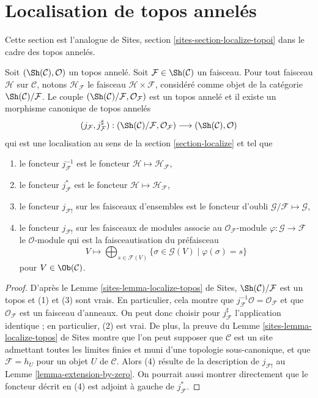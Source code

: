 \section{Localisation de topos annelés}
\label{section-localize-ringed-topoi}

\noindent
Cette section est l'analogue de
Sites, section \ref{sites-section-localize-topoi}
dans le cadre des topos annelés.

\begin{lemma}
\label{lemma-localize-ringed-topos}
Soit $(\Sh(\mathcal{C}), \mathcal{O})$ un topos annelé.
Soit $\mathcal{F} \in \Sh(\mathcal{C})$ un faisceau.
Pour tout faisceau $\mathcal{H}$ sur $\mathcal{C}$, notons
$\mathcal{H}_\mathcal{F}$ le faisceau $\mathcal{H} \times \mathcal{F}$,
considéré comme objet de la catégorie
$\Sh(\mathcal{C})/\mathcal{F}$. Le couple
$(\Sh(\mathcal{C})/\mathcal{F}, \mathcal{O}_\mathcal{F})$
est un topos annelé et il existe un morphisme canonique de topos annelés
$$
(j_\mathcal{F}, j_\mathcal{F}^\sharp) :
(\Sh(\mathcal{C})/\mathcal{F}, \mathcal{O}_\mathcal{F})
\longrightarrow
(\Sh(\mathcal{C}), \mathcal{O})
$$
qui est une localisation au sens de la
section \ref{section-localize} et tel que
\begin{enumerate}
\item le foncteur $j_\mathcal{F}^{-1}$ est le foncteur
$\mathcal{H} \mapsto \mathcal{H}_\mathcal{F}$,
\item le foncteur $j_\mathcal{F}^*$ est le foncteur
$\mathcal{H} \mapsto \mathcal{H}_\mathcal{F}$,
\item le foncteur $j_{\mathcal{F}!}$ sur les faisceaux d'ensembles est le
foncteur d'oubli $\mathcal{G}/\mathcal{F} \mapsto \mathcal{G}$,
\item le foncteur $j_{\mathcal{F}!}$ sur les faisceaux de modules associe au
$\mathcal{O}_\mathcal{F}$-module
$\varphi : \mathcal{G} \to \mathcal{F}$ le $\mathcal{O}$-module qui est la
faisceautisation du préfaisceau
$$
V \longmapsto
\bigoplus\nolimits_{s \in \mathcal{F}(V)}
\{\sigma \in \mathcal{G}(V) \mid \varphi(\sigma) = s \}
$$
pour $V \in \Ob(\mathcal{C})$.
\end{enumerate}
\end{lemma}

\begin{proof}
D'après le Lemme \ref{sites-lemma-localize-topos} de Sites,
$\Sh(\mathcal{C})/\mathcal{F}$ est un topos et (1) et (3) sont vrais.
En particulier, cela montre que
$j_\mathcal{F}^{-1}\mathcal{O} = \mathcal{O}_\mathcal{F}$ et que
$\mathcal{O}_\mathcal{F}$ est un faisceau d'anneaux.
On peut donc choisir pour $j_\mathcal{F}^\sharp$ l'application identique ;
en particulier, (2) est vrai. De plus, la preuve du
Lemme \ref{sites-lemma-localize-topos} de Sites montre que l'on peut supposer
que $\mathcal{C}$ est un site admettant toutes les limites finies et muni
d'une topologie sous-canonique, et que $\mathcal{F} = h_U$ pour un objet
$U$ de $\mathcal{C}$. Alors (4) résulte de la description de
$j_{\mathcal{F}!}$ au Lemme \ref{lemma-extension-by-zero}.
On pourrait aussi montrer directement que le foncteur décrit en (4) est
adjoint à gauche de $j_\mathcal{F}^*$.
\end{proof}

